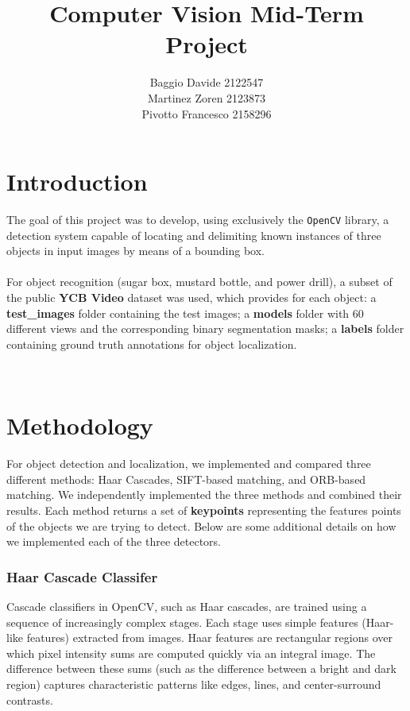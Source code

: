 \documentclass[10.5pt,a4paper]{article}
\title{Computer Vision Mid-Term Project}
\author{Baggio Davide 2122547 \\ Martinez Zoren 2123873 \\ Pivotto Francesco 2158296}
\date{}
\begin{document}
\maketitle

\section*{Introduction}

The goal of this project was to develop, using exclusively the \texttt{OpenCV} library, a detection system capable of locating and delimiting known instances of three objects in input images by means of a bounding box.
\\\\
For object recognition (sugar box, mustard bottle, and power drill), a subset of the public \textbf{YCB Video} dataset was used, which provides for each object:
a \textbf{test\_images} folder containing the test images; a \textbf{models} folder with 60 different views and the corresponding binary segmentation masks; a \textbf{labels} folder containing ground truth annotations for object localization.

\\

\section*{Methodology}

For object detection and localization, we implemented and compared three different methods: Haar Cascades, SIFT-based matching, and ORB-based matching. We independently implemented the three methods and combined their results. Each method returns a set of \textbf{keypoints} representing the features points of the objects we are trying to detect. Below are some additional details on how we implemented each of the three detectors.

\subsubsection*{Haar Cascade Classifer}
    Cascade classifiers in OpenCV, such as Haar cascades, are trained using a sequence of increasingly complex stages. Each stage uses simple features (Haar-like features) extracted from images. Haar features are rectangular regions over which pixel intensity sums are computed quickly via an integral image. The difference between these sums (such as the difference between a bright and dark region) captures characteristic patterns like edges, lines, and center-surround contrasts.
\end{document}
